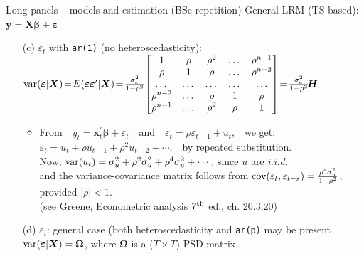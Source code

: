 \documentclass[usenames,dvipsnames]{beamer}
\begin{document}
\begin{frame}{Long panels -- models and estimation (BSc repetition)}
\footnotesize
General LRM (TS-based): $\bm{y} = \bm{X\beta}+\bm{\varepsilon}$\\ \medskip 
\begin{itemize}
    \item[(c)] $\varepsilon_t$ with \texttt{ar(1)} (no heteroscedasticity): \\ \medskip $\textnormal{var}(\bm{\varepsilon}|\bm{X}) \! = \! E(\bm{\varepsilon \varepsilon}^{\prime}|\bm{X}) \!=  \!
     \frac{\sigma^2_e}{1-\rho^2} \!
\begin{bmatrix}
1 		& 	\rho 	& \rho^2		& \dots &	\rho^{n-1} \\
\rho 	& 	1 		& \rho 	&  	\dots &	\rho^{n-2}		\\
\dots	& 	\dots 		& \dots 	&  	\dots&	\dots		\\
 \rho^{n-2}		& \dots &	\rho	& 1		&\rho 		\\
\rho^{n-1}&	\dots		& \rho^2	&\rho &		1
\end{bmatrix} \! =\! \frac{\sigma^2_e}{1-\rho^2} \! \bm{H}$ \\ \medskip
\begin{itemize}
    \item From~~$y_t = \bm{x}_t^{\prime}\bm{\beta}+\varepsilon_t$~~and~~$\varepsilon_t = \rho \varepsilon_{t-1}+u_t$,~~we get: \\ \smallskip
    $\varepsilon_t = u_t + \rho u_{t-1} + \rho^2 u_{t-2} + \cdots$,~~by repeated substitution.\\
    Now, $\textnormal{var}(u_t)=\sigma^2_u + \rho^2 \sigma^2_u + \rho^4 \sigma^2_u + \cdots$, since $u$ are \textit{i.i.d.}\\
    and the variance-covariance matrix follows from $\textnormal{cov}(\varepsilon_t,\varepsilon_{t-s})=\tfrac{\rho^s \sigma^2_u}{1-\rho^2}$, provided $|\rho|<1$.\\
    (see Greene, Econometric analysis $7^{\textnormal{th}}$ ed., ch. 20.3.20)
\end{itemize}
    \bigskip
    \item[(d)] $\varepsilon_t$: general case (both heteroscedasticity and \texttt{ar(p)} may be present\\ \medskip
    $\textnormal{var}(\bm{\varepsilon}|\bm{X}) = \bm{\Omega}$, where $\bm{\Omega}$ is a ($T\! \times \! T$) PSD matrix.
\end{itemize}
\end{frame}
\end{document}
